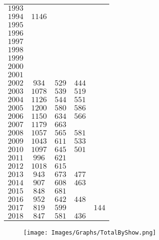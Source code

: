 \begin{longtable}{|l|cccc|}
    $1993$  &       &       &       &       \\
    $1994$  & $1146$&       &       &       \\
    $1995$  &       &       &       &       \\
    $1996$  &       &       &       &       \\
    $1997$  &       &       &       &       \\
    $1998$  &       &       &       &       \\
    $1999$  &       &       &       &       \\
    $2000$  &       &       &       &       \\
    $2001$  &       &       &       &       \\
    $2002$  & $934$ & $529$ & $444$ &       \\
    $2003$  & $1078$& $539$ & $519$ &       \\
    $2004$  & $1126$& $544$ & $551$ &       \\
    $2005$  & $1200$& $580$ & $586$ &       \\
    $2006$  & $1150$& $634$ & $566$ &       \\
    $2007$  & $1179$& $663$ &       &       \\
    $2008$  & $1057$& $565$ & $581$ &       \\
    $2009$  & $1043$& $611$ & $533$ &       \\
    $2010$  & $1097$& $645$ & $501$ &       \\
    $2011$  & $996$ & $621$ &       &       \\
    $2012$  & $1018$& $615$ &       &       \\
    $2013$  & $943$ & $673$ & $477$ &       \\
    $2014$  & $907$ & $608$ & $463$ &       \\
    $2015$  & $848$ & $681$ &       &       \\
    $2016$  & $952$ & $642$ & $448$ &       \\
    $2017$  & $819$ & $599$ &       & $144$ \\
    $2018$  & $847$ & $581$ & $436$ &       \\
\hline
\end{longtable}

\begin{landscape}
\begin{figure}[H]
\centering
\texttt{[image: Images/Graphs/TotalByShow.png]}
\end{figure}
\end{landscape}
